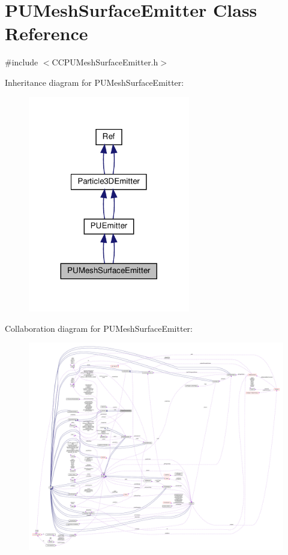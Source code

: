 \hypertarget{classPUMeshSurfaceEmitter}{}\section{P\+U\+Mesh\+Surface\+Emitter Class Reference}
\label{classPUMeshSurfaceEmitter}


{\ttfamily \#include $<$C\+C\+P\+U\+Mesh\+Surface\+Emitter.\+h$>$}



Inheritance diagram for P\+U\+Mesh\+Surface\+Emitter\+:
\nopagebreak
\begin{figure}[H]
\begin{center}
\leavevmode
\includegraphics[width=200pt]{classPUMeshSurfaceEmitter__inherit__graph}
\end{center}
\end{figure}


Collaboration diagram for P\+U\+Mesh\+Surface\+Emitter\+:
\nopagebreak
\begin{figure}[H]
\begin{center}
\leavevmode
\includegraphics[width=350pt]{classPUMeshSurfaceEmitter__coll__graph}
\end{center}
\end{figure}
